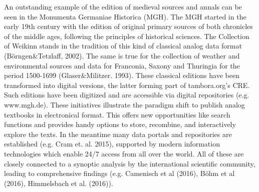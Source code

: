 An outstanding example of the edition of medieval sources and annals can be seen in the Monumenta Germaniae Historica (MGH). The MGH started in the early 19th century with the edition of original primary sources of both chronicles of the middle ages, following the principles of historical sciences. The Collection of Weikinn stands in the tradition of this kind of classical analog data format (Börngen\&Tetzlaff, 2002). The same is true for the collection of weather and environmental sources and data for Franconia, Saxony and Thuringia for the period 1500-1699 (Glaser\&Militzer. 1993). These classical editions have been transformed into digital versions, the latter forming part of tambora.org’s CRE. Such editions have been digitized and are accessible via digital repositories (e.g. www.mgh.de). These initiatives illustrate the paradigm shift to publish analog textbooks in electronical format. This offers new opportunities like search functions and provides handy options to store, recombine, and interactively explore the texts. In the meantime many data portals and repositories are established (e.g. Cram et. al. 2015), supported by modern information technologies which enable 24/7 access from all over the world. All of these are closely connected to a synoptic analysis by the international scientific community, leading to comprehensive findings (e.g. Camenisch et al (2016), Böhm et al (2016), Himmelsbach et al. (2016)).

